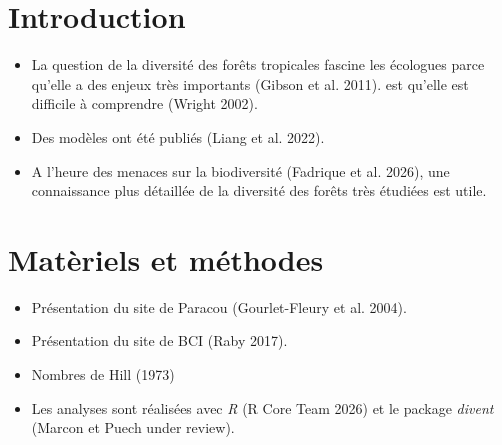 \documentclass[
  french,
  11pt,
]{stylisharticle}
\affiliation{%
      \textsuperscript{1}%
      Dummy Organization%
      , Scientific Department%
      , Somewhere%
      , City%
      , Country%
      , 9999%
    }
\providecommand{\tightlist}{%
  \setlength{\itemsep}{0pt}\setlength{\parskip}{0pt}}
\begin{document}
\flushbottom

\maketitle

\tableofcontents

\thispagestyle{empty}

\section{Introduction}\label{introduction}

\begin{itemize}
\item
  La question de la diversité des forêts tropicales fascine les
  écologues parce qu'elle a des enjeux très importants ({Gibson et al.}
  2011). est qu'elle est difficile à comprendre (Wright 2002).
\item
  Des modèles ont été publiés ({Liang et al.} 2022).
\item
  A l'heure des menaces sur la biodiversité ({Fadrique et al.} 2026),
  une connaissance plus détaillée de la diversité des forêts très
  étudiées est utile.
\end{itemize}

\section{Matèriels et méthodes}\label{matuxe8riels-et-muxe9thodes}

\begin{itemize}
\tightlist
\item
  Présentation du site de Paracou (Gourlet-Fleury et al. 2004).
\end{itemize}

\scriptsize

\normalsize

\begin{itemize}
\tightlist
\item
  Présentation du site de BCI (Raby 2017).
\end{itemize}

\scriptsize

\normalsize

\begin{itemize}
\item
  Nombres de Hill (1973)
\item
  Les analyses sont réalisées avec \emph{R} (R Core Team 2026) et le
  package \emph{divent} (Marcon et Puech under review).
\end{itemize}
\end{document}
